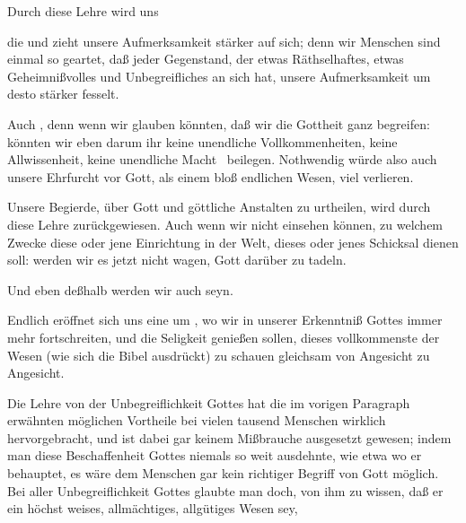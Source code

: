 Durch diese Lehre wird uns
\begin{aufza}
\item die  und zieht unsere Aufmerksamkeit stärker auf sich; denn wir Menschen sind einmal so geartet, daß jeder Gegenstand, der etwas Räthselhaftes, etwas Geheimnißvolles und Unbegreifliches an sich hat, unsere Aufmerksamkeit um desto stärker fesselt.
\item Auch , denn wenn wir glauben könnten, daß wir die Gottheit ganz begreifen: könnten wir eben darum ihr keine unendliche Vollkommenheiten, keine Allwissenheit, keine unendliche Macht \usw\ beilegen. Nothwendig würde also auch unsere Ehrfurcht vor Gott, als einem bloß endlichen Wesen, viel verlieren.~
\item Unsere Begierde, über Gott und göttliche Anstalten zu urtheilen, wird durch diese Lehre  zurückgewiesen. Auch wenn wir nicht einsehen können, zu welchem Zwecke diese oder jene Einrichtung in der Welt, dieses oder jenes Schicksal dienen soll: werden wir es jetzt nicht wagen, Gott darüber zu tadeln.
\item Und eben deßhalb werden wir auch  seyn.
\item Endlich eröffnet sich uns eine um , wo wir in unserer Erkenntniß Gottes immer mehr fortschreiten, und die Seligkeit genießen sollen, dieses vollkommenste der Wesen (wie sich die Bibel ausdrückt) zu schauen gleichsam von Angesicht zu Angesicht.
\end{aufza}

Die Lehre von der Unbegreiflichkeit Gottes hat die im vorigen Paragraph erwähnten möglichen Vortheile bei vielen tausend Menschen wirklich hervorgebracht, und ist dabei gar keinem Mißbrauche ausgesetzt gewesen; indem man diese Beschaffenheit Gottes niemals so weit ausdehnte, wie etwa  wo er behauptet, es wäre dem Menschen gar kein richtiger Begriff von Gott möglich. Bei aller Unbegreiflichkeit Gottes glaubte man doch, von ihm zu wissen, daß er ein höchst weises, allmächtiges, allgütiges Wesen sey, \usw\

